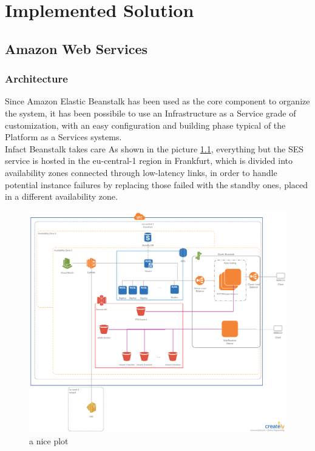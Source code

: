 \chapter{Implemented Solution}
\section{Amazon Web Services}

\subsection{Architecture}
Since Amazon Elastic Beanstalk has been used as the core component to organize the system, it has been possibile to use an Infrastructure as a Service grade of customization, with an easy configuration and building phase typical of the Platform as a Services systems.\\
Infact Beanstalk takes care 
As shown in the picture \ref{fig:architecture}, everything but the SES service is hosted in the eu-central-1 region in Frankfurt, which is divided into availability zones connected through low-latency links, in order to handle potential instance failures by replacing those failed with the standby ones, placed in a different availability zone.\\

\begin{figure}[h]
    \includegraphics[width=\textwidth]{architecture}
    \caption{a nice plot}
    \label{fig:architecture}
\end{figure}
